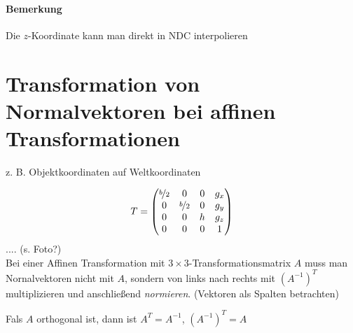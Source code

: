 \paragraph{Bemerkung} Die $z$-Koordinate kann man direkt in NDC interpolieren

\section{Transformation von Normalvektoren bei affinen Transformationen}
z. B. Objektkoordinaten auf Weltkoordinaten
\begin{center}
\end{center}
\[T = \begin{pmatrix}
       \nicefrac{b}{2} & 0 & 0 & g_x\\
       0 & \nicefrac{b}{2} & 0 & g_y\\
       0 & 0 & h & g_z\\
       0 & 0 & 0 & 1
      \end{pmatrix}
\]
.... (s. Foto?)\\
Bei einer Affinen Transformation mit $3 \times 3$-Transformationsmatrix $A$ muss man Nornalvektoren nicht
mit $A$, sondern von links nach rechts mit $(A^{-1})^T$ multiplizieren und anschließend \emph{normieren}.
(Vektoren als Spalten betrachten)

Fals $A$ orthogonal ist, dann ist $A^T = A^{-1}$, $(A^{-1})^T = A$



